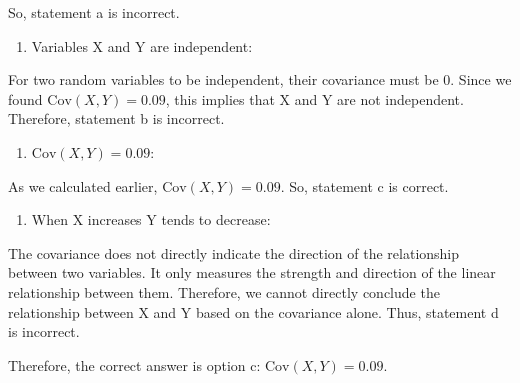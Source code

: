 \documentclass[11pt]{article}
\makeatletter
\providecommand{\tightlist}{%
      \setlength{\itemsep}{0pt}\setlength{\parskip}{0pt}}
\newcommand{\boxspacing}{\kern\kvtcb@left@rule\kern\kvtcb@boxsep}
\newcommand{\prompt}[4]{
        {\ttfamily\llap{{\color{#2}[#3]:\hspace{3pt}#4}}\vspace{-\baselineskip}}
    }
\makeatother
\begin{document}
So, statement a is incorrect.

\begin{enumerate}
\def\labelenumi{\alph{enumi}.}
\setcounter{enumi}{1}
\tightlist
\item
  Variables X and Y are independent:
\end{enumerate}

For two random variables to be independent, their covariance must be 0.
Since we found $ \text{Cov}(X,Y) = 0.09 $, this implies that X and Y
are not independent. Therefore, statement b is incorrect.

\begin{enumerate}
\def\labelenumi{\alph{enumi}.}
\setcounter{enumi}{2}
\tightlist
\item
  $ \text{Cov}(X,Y) = 0.09 $:
\end{enumerate}

As we calculated earlier, $ \text{Cov}(X,Y) = 0.09 $. So, statement c
is correct.

\begin{enumerate}
\def\labelenumi{\alph{enumi}.}
\setcounter{enumi}{3}
\tightlist
\item
  When X increases Y tends to decrease:
\end{enumerate}

The covariance does not directly indicate the direction of the
relationship between two variables. It only measures the strength and
direction of the linear relationship between them. Therefore, we cannot
directly conclude the relationship between X and Y based on the
covariance alone. Thus, statement d is incorrect.

Therefore, the correct answer is option c: $ \text{Cov}(X,Y) = 0.09 $.

    \begin{tcolorbox}[breakable, size=fbox, boxrule=1pt, pad at break*=1mm,colback=cellbackground, colframe=cellborder]
\prompt{In}{incolor}{ }{\boxspacing}
\begin{Verbatim}[commandchars=\\\{\}]

\end{Verbatim}
\end{tcolorbox}


    
    
    
\end{document}
